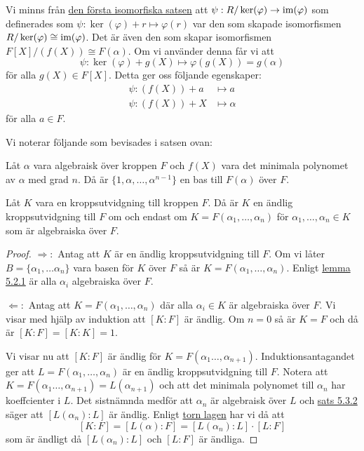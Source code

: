\documentclass{article}
\newcommand{\im}[0]{\textnormal{im}}
\theoremstyle{definition}
\begin{document}
Vi minns från \hyperlink{isomorfiska}{den första isomorfiska satsen} att $\psi:R/\ker(\varphi) \rightarrow \im(\varphi)$ som definerades som 
$\psi: \ker(\varphi) + r \mapsto \varphi(r)$ var den som skapade isomorfismen $R/\ker(\varphi) \cong \im(\varphi)$. Det är även 
den som skapar isomorfismen $F[X]/(f(X)) \cong F(\alpha)$. Om vi använder denna får vi att
\[\psi: \ker(\varphi) + g(X) \mapsto \varphi(g(X)) = g(\alpha)\]
för alla $g(X) \in F[X]$. Detta ger oss följande egenskaper: 
\begin{align*}
  \psi: (f(X)) + a &\mapsto a \\
  \psi: (f(X)) + X &\mapsto \alpha
\end{align*}
för alla $a \in F.$

Vi noterar följande som bevisades i satsen ovan: 
\hypertarget{kol5.3.1}{}
\begin{mykol}{}{}
  Låt $\alpha$ vara algebraisk över kroppen $F$ och $f(X)$ vara det minimala polynomet av $\alpha$ med grad $n$. 
  Då är $\{1, \alpha, \ldots, \alpha^{n-1}\}$ en bas till $F(\alpha)$ över $F$. 
\end{mykol}

\hypertarget{sats5.3.3}{}
\begin{mytheo}{}{}
  Låt $K$ vara en kroppsutvidgning till kroppen $F$. Då är $K$ en ändlig kroppsutvidgning till $F$ om och endast om $K = F(\alpha_1, \ldots, \alpha_n)$
  för $\alpha_1, \ldots, \alpha_n \in K$ som är algebraiska över $F$.
\end{mytheo}

\begin{proof}
  $\Rightarrow:$ Antag att $K$ är en ändlig kroppsutvidgning till $F$. Om vi låter
  $B = \{\alpha_1, \ldots \alpha_n\}$ vara basen för $K$ över $F$ så är $K = F(\alpha_1, \ldots, \alpha_n)$. Enligt 
  \hyperlink{algebraiskkropp}{lemma 5.2.1} är alla $\alpha_i$ algebraiska över $F$.

  $\Leftarrow:$ Antag att $K = F(\alpha_1, \ldots, \alpha_n)$ där alla $\alpha_i \in K$ är algebraiska över $F$. Vi visar med hjälp av induktion att 
  $[K:F]$ är ändlig. Om $n = 0$ så är $K = F$ och då är $[K:F] = [K:K] = 1$.

  Vi visar nu att $[K:F]$ är ändlig för $K = F(\alpha_1 \ldots, \alpha_{n+1})$. Induktionsantagandet ger att $L = F(\alpha_1, \ldots, \alpha_n)$ 
  är en ändlig kroppsutvidgning till $F$. Notera att $K = F(\alpha_1 \ldots, \alpha_{n+1}) = L(\alpha_{n+1})$ och att det minimala polynomet till $\alpha_n$
  har koeffcienter i $L$. Det sistnämnda medför att $\alpha_n$ är algebraisk över $L$ och \hyperlink{5.3.2}{sats 5.3.2} säger att $[L(\alpha_n):L]$
  är ändlig. Enligt \hyperlink{torn lagen}{torn lagen} har vi då att 
  \[ [K:F] = [L(\alpha):F] = [L(\alpha_n): L] \cdot [L : F]\]
  som är ändligt då $[L(\alpha_n): L]$ och $[L : F]$ är ändliga. 
\end{proof}
\end{document}
